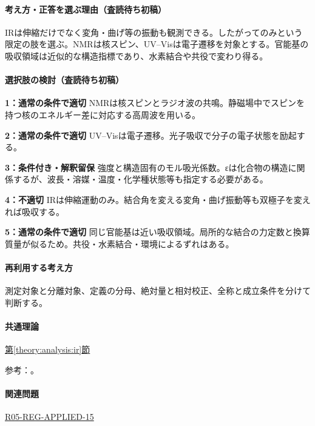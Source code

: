 \paragraph{考え方・正答を選ぶ理由（査読待ち初稿）} IRは伸縮だけでなく変角・曲げ等の振動も観測できる。したがってのみという限定の肢を選ぶ。NMRは核スピン、UV–Visは電子遷移を対象とする。官能基の吸収領域は近似的な構造指標であり、水素結合や共役で変わり得る。

\paragraph{選択肢の検討（査読待ち初稿）}\mbox{}\par

\noindent\textbf{1：通常の条件で適切} NMRは核スピンとラジオ波の共鳴。静磁場中でスピンを持つ核のエネルギー差に対応する高周波を用いる。\par

\noindent\textbf{2：通常の条件で適切} UV–Visは電子遷移。光子吸収で分子の電子状態を励起する。\par

\noindent\textbf{3：条件付き・解釈留保} 強度と構造固有のモル吸光係数。εは化合物の構造に関係するが、波長・溶媒・温度・化学種状態等も指定する必要がある。\par

\noindent\textbf{4：不適切} IRは伸縮運動のみ。結合角を変える変角・曲げ振動等も双極子を変えれば吸収する。\par

\noindent\textbf{5：通常の条件で適切} 同じ官能基は近い吸収領域。局所的な結合の力定数と換算質量が似るため。共役・水素結合・環境によるずれはある。\par

\paragraph{再利用する考え方} 測定対象と分離対象、定義の分母、絶対量と相対校正、全称と成立条件を分けて判断する。

\paragraph{共通理論} \hyperref[theory:analysis:ir]{第\ref*{theory:analysis:ir}節}

\par 参考：\cite{analysis49_ir_ref,analysis49_beer_ref}。

\paragraph{関連問題} \hyperref[q:r05-reg-applied-15]{R05-REG-APPLIED-15}

